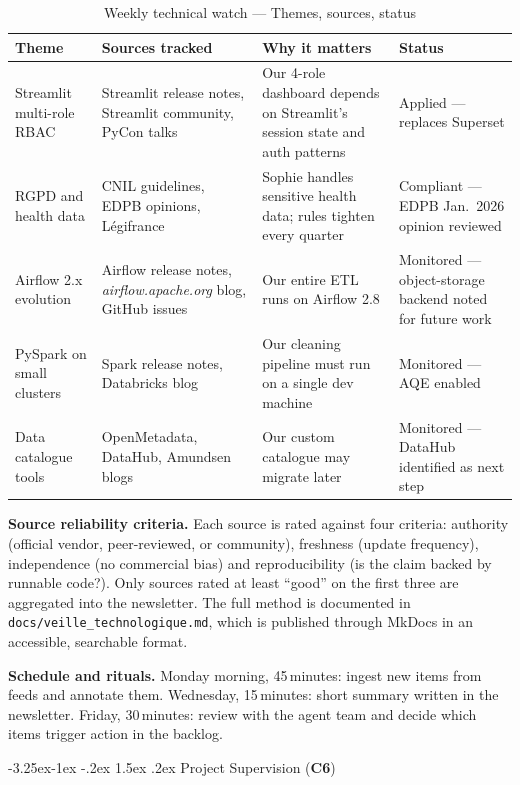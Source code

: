 \documentclass[a4paper,11pt,oneside,openany]{report}
\makeatletter
\renewcommand\subsection{\@startsection{subsection}{2}{\z@}%
  {-3.25ex\@plus -1ex \@minus -.2ex}%
  {1.5ex \@plus .2ex}%
  {\normalfont\large\bfseries\color{ntdarkgreen}}}
\newcommand{\competence}[1]{\textbf{\textcolor{ntgreen}{#1}}}
\newcommand{\rgpd}{RGPD}
\makeatother
\begin{document}
\begin{table}[H]
\centering
\caption{Weekly technical watch --- Themes, sources, status}
\label{tab:veille}
\begin{tabularx}{\textwidth}{L{3cm} L{4cm} L{4cm} L{2.5cm}}
\toprule
\textbf{Theme} & \textbf{Sources tracked} & \textbf{Why it matters} & \textbf{Status} \\
\midrule
Streamlit multi-role RBAC & Streamlit release notes, Streamlit community, PyCon talks & Our 4-role dashboard depends on Streamlit's session state and auth patterns & Applied --- replaces Superset \\
\rgpd{} and health data & CNIL guidelines, EDPB opinions, Légifrance & Sophie handles sensitive health data; rules tighten every quarter & Compliant --- EDPB Jan.\ 2026 opinion reviewed \\
Airflow 2.x evolution & Airflow release notes, \textit{airflow.apache.org} blog, GitHub issues & Our entire ETL runs on Airflow 2.8 & Monitored --- object-storage backend noted for future work \\
PySpark on small clusters & Spark release notes, Databricks blog & Our cleaning pipeline must run on a single dev machine & Monitored --- AQE enabled \\
Data catalogue tools & OpenMetadata, DataHub, Amundsen blogs & Our custom catalogue may migrate later & Monitored --- DataHub identified as next step \\
\bottomrule
\end{tabularx}
\end{table}

\textbf{Source reliability criteria.} Each source is rated against
four criteria: authority (official vendor, peer-reviewed, or
community), freshness (update frequency), independence (no
commercial bias) and reproducibility (is the claim backed by
runnable code?). Only sources rated at least ``good'' on the first
three are aggregated into the newsletter. The full method is
documented in \texttt{docs/veille\_technologique.md}, which is
published through MkDocs in an accessible, searchable format.

\textbf{Schedule and rituals.} Monday morning, 45\,minutes:
ingest new items from feeds and annotate them. Wednesday,
15\,minutes: short summary written in the newsletter. Friday,
30\,minutes: review with the agent team and decide which items
trigger action in the backlog.

\subsection{Project Supervision (\competence{C6})}
\end{document}
